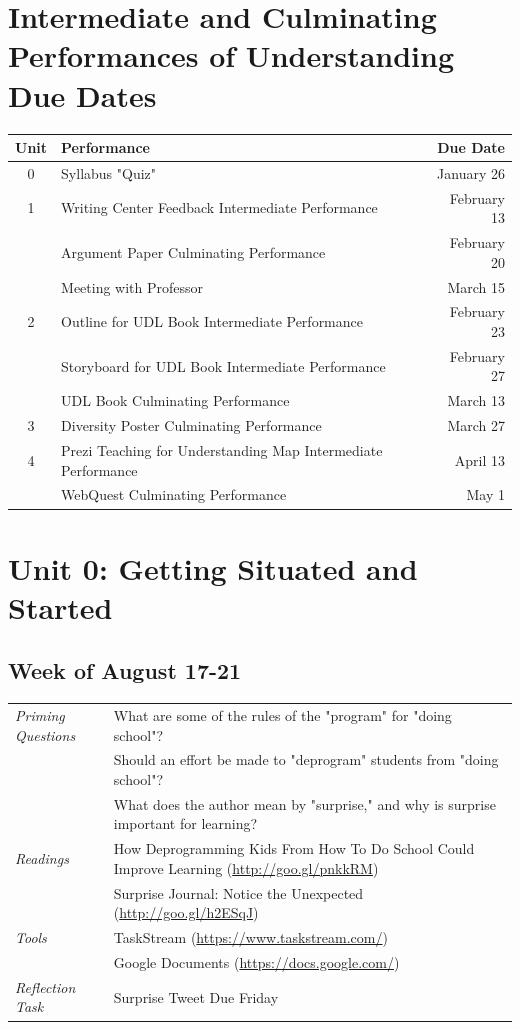 \documentclass{tufte-handout}
\newcommand{\tabpq}{\faQuestionSign\medspace\textit{Priming Questions}}
\newcommand{\tabread}{\faBook\medspace\textit{Readings}}
\newcommand{\tabtools}{\faWrench\medspace\textit{Tools}}
\newcommand{\tabtweet}{\faLightbulb\medspace\textit{Reflection Task} & Surprise Tweet Due Friday \\}
\newenvironment{tabsched}
	{\small
	\begin{tabular}{p{1.5in}p{4.5in}}
	\toprule}
	{\bottomrule
	\end{tabular}
	\normalsize}
\newcommand{\weekone}{August 17-21}
\begin{document}
\medskip

\section{Intermediate and Culminating Performances of Understanding Due Dates}
\begin{tabular}{clr}
	\toprule
	Unit & Performance & Due Date \\
	\midrule\midrule
	0 & Syllabus "Quiz" & January 26 \\
	\midrule
	1 & Writing Center Feedback Intermediate Performance & February 13 \\
	& Argument Paper Culminating Performance & February 20 \\
	& Meeting with Professor & March 15 \\
	\midrule
	2 & Outline for UDL Book Intermediate Performance & February 23 \\
	& Storyboard for UDL Book Intermediate Performance & February 27 \\
	& UDL Book Culminating Performance & March 13 \\
	\midrule
	3 & Diversity Poster Culminating Performance & March 27 \\
	\midrule
	4 & Prezi Teaching for Understanding Map Intermediate Performance  & April 13 \\
	& WebQuest Culminating Performance & May 1 \\
	\bottomrule
\end{tabular}

\section{Unit 0: Getting Situated and Started}

\subsection{Week of \weekone}

\begin{tabsched}
	\tabpq & What are some of the rules of the "program" for "doing school"? \\
	& Should an effort be made to "deprogram" students from "doing school"? \\
	& What does the author mean by "surprise," and why is surprise important for learning? \\
	\midrule
	\tabread & How Deprogramming Kids From How To Do School Could Improve Learning (\url{http://goo.gl/pnkkRM}) \\
	& Surprise Journal: Notice the Unexpected (\url{http://goo.gl/h2ESqJ}) \\
	\midrule
	\tabtools & TaskStream (\url{https://www.taskstream.com/}) \\
	& Google Documents (\url{https://docs.google.com/}) \\
	\midrule
	\tabtweet
\end{tabsched}
\end{document}
